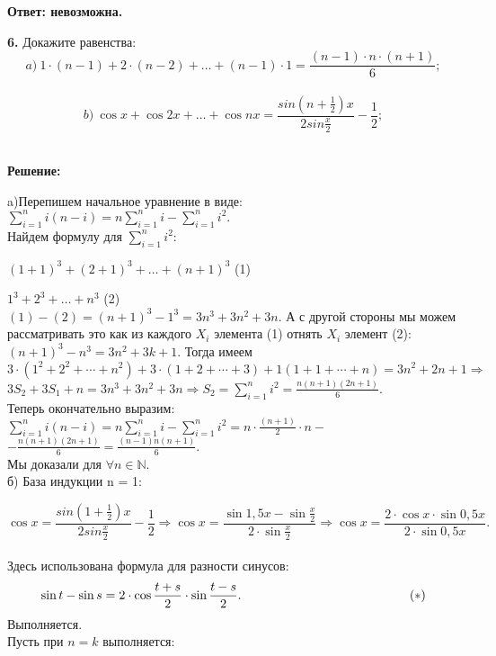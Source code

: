 \documentclass[a4paper,12pt]{article} %
\begin{document}
\begin{flushright}
\begin{large}
\textbf {Ответ: невозможна.}
\end{large}
\end{flushright}

{\bf 6.} Докажите равенства:\\
\[a)\ 1 \cdot(n - 1) + 2 \cdot (n - 2) + \dots + (n - 1) \cdot 1 = \frac{(n-1)\cdot n\cdot (n+1)}{6};\]\\
\[b)\  \cos{x} + \cos2x + \dots + \cos{nx} = \frac{sin(n+\frac{1}{2})x}{2sin\frac{x}{2}} - \frac{1}{2};\]\\
\newpage
\begin{center}
\bfseries
{\Large Решение: }
\end{center}
a)Перепишем начальное уравнение в виде: $\sum\limits_{i=1}^n i(n-i) = n\sum\limits_{i=1}^n i - \sum\limits_{i=1}^n i^2.$\\
Найдем формулу для $\sum\limits_{i=1}^n i^2:$

$ (1+1)^{3}+(2+1)^{3}+ \dots + (n+1)^{3} $\hspace{25mm} (1)

$  1^3 +2^3 + \dots + n^3 $ \hspace{54.8mm} (2)\\
$ (1) - (2) = (n+1)^3-1^3=3n^3+3n^2+3n.$
А с другой стороны мы можем рассматривать это как из каждого $X_{i}$ элемента (1) отнять $X_{i}$ элемент (2): $(n+1)^3 - n^3 = 3n^2 +3k + 1$. Тогда имеем 
$ 3\cdot(1^2+2^2+\cdots +n^2)+3\cdot(1+2+\cdots + 3)+1(1+1+\cdots+n) =  3n^2+2n+1 \Rightarrow$
$3S_{2}+3S_{1}+n = 3n^3+3n^2+3n \Rightarrow S_{2}= \sum\limits_{i=1}^n i^2 = \frac{n(n+1)(2n+1)}{6}.$\\
Теперь окончательно выразим: $\sum\limits_{i=1}^n i(n-i) = n\sum\limits_{i=1}^n i - \sum\limits_{i=1}^n i^2 = n\cdot \frac{(n+1)}{2}\cdot n -$
$ -\frac{n(n+1)(2n+1)}{6} = \frac{(n-1)n(n+1)}{6}.$\\
Мы доказали для $\forall n \in \mathbb{N}$.\\

б) База индукции n = 1:

\[ \cos{x} = \frac{sin(1+\frac{1}{2})x}{2sin\frac{x}{2}} - \frac{1}{2} \Rightarrow \cos{x} = \frac{\sin{1,5x} - \sin{\frac{x}{2}}}{2\cdot \sin{\frac{x}{2}}} \Rightarrow \cos{x} = \frac{2\cdot \cos{x}\cdot \sin{0,5x}}{2\cdot \sin{0,5x}}.\]\\
Здесь использована формула для разности синусов:
\[ \sin{t} - \sin{s} = 2\cdot \cos{\frac{t+s}{2}}\cdot \sin{\frac{t - s}{2}}. \hspace{47mm} (*) \]
Выполняется.\\
Пусть при $n = k$	 выполняется:
\end{document}
